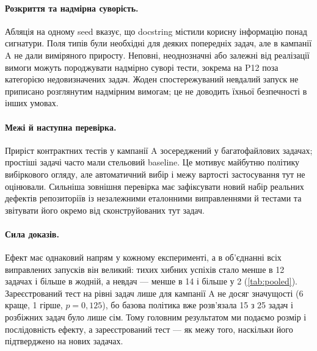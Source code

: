 \documentclass[11pt]{article}
\begin{document}
\paragraph{Розкриття та надмірна суворість.} Абляція на одному seed вказує, що docstring містили корисну інформацію понад сигнатури. Поля типів були необхідні для деяких попередніх задач, але в кампанії A не дали виміряного приросту. Неповні, неоднозначні або залежні від реалізації вимоги можуть породжувати надмірно суворі тести, зокрема на P12 поза категорією недовизначених задач. Жоден спостережуваний невдалий запуск не приписано розглянутим надмірним вимогам; це не доводить їхньої безпечності в інших умовах.

\paragraph{Межі й наступна перевірка.} Приріст контрактних тестів у кампанії A зосереджений у багатофайлових задачах; простіші задачі часто мали стельовий baseline. Це мотивує майбутню політику вибіркового огляду, але автоматичний вибір і межу вартості застосування тут не оцінювали. Сильніша зовнішня перевірка має зафіксувати новий набір реальних дефектів репозиторіїв із незалежними еталонними виправленнями й тестами та звітувати його окремо від сконструйованих тут задач.

\paragraph{Сила доказів.} Ефект має однаковий напрям у кожному експерименті, а в об'єднанні всіх виправлених запусків він великий: тихих хибних успіхів стало менше в 12 задачах і більше в жодній, а невдач --- менше в 14 і більше у 2 (\cref{tab:pooled}). Зареєстрований тест на рівні задач лише для кампанії A не досяг значущості (6 краще, 1 гірше, $p=0{,}125$), бо базова політика вже розв'язала 15 з 25 задач і розбіжних задач було лише сім. Тому головним результатом ми подаємо розмір і послідовність ефекту, а зареєстрований тест --- як межу того, наскільки його підтверджено на нових задачах.

\end{document}
